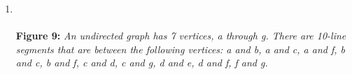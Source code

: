 \documentclass{amsart}
\theoremstyle{definition}
\theoremstyle{Exercise}
\theoremstyle{remark}
\theoremstyle{rule}
\numberwithin{equation}{section}
\begin{document}
\begin{enumerate}[label=(\alph*)]
\newpage
~\\~\\
\item 
{}
\\\\
{\color{blue} {\bf Figure 9:} \emph{An undirected graph has 7 vertices, a through g. There are 10-line segments that are between the following vertices: a and b, a and c, a and f, b and c, b and f, c and d, c and g, d and e, d and f, f and g. 
  }
}
\\\\
\\\\


  \end{enumerate}
\newpage
~\\
\end{document}
